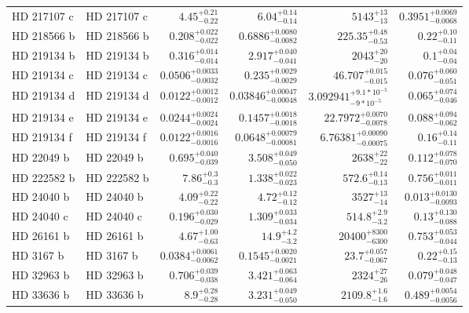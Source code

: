 \begin{longtable*}{llrrrr}
HD 217107 c & HD 217107 c & $4.45^{+0.21}_{-0.22}$ & $6.04^{+0.14}_{-0.14}$ & $5143^{+13}_{-13}$ & $0.3951^{+0.0069}_{-0.0068}$ \\ 
HD 218566 b & HD 218566 b & $0.208^{+0.022}_{-0.022}$ & $0.6886^{+0.0080}_{-0.0082}$ & $225.35^{+0.48}_{-0.53}$ & $0.22^{+0.10}_{-0.11}$ \\ 
HD 219134 b & HD 219134 b & $0.316^{+0.014}_{-0.014}$ & $2.917^{+0.040}_{-0.041}$ & $2043^{+20}_{-20}$ & $0.1^{+0.04}_{-0.04}$ \\ 
HD 219134 c & HD 219134 c & $0.0506^{+0.0033}_{-0.0032}$ & $0.235^{+0.0029}_{-0.0029}$ & $46.707^{+0.015}_{-0.015}$ & $0.076^{+0.060}_{-0.051}$ \\ 
HD 219134 d & HD 219134 d & $0.0122^{+0.0012}_{-0.0012}$ & $0.03846^{+0.00047}_{-0.00048}$ & $3.092941^{+9.1*10^{-5}}_{-9*10^{-5}}$ & $0.065^{+0.074}_{-0.046}$ \\ 
HD 219134 e & HD 219134 e & $0.0244^{+0.0024}_{-0.0024}$ & $0.1457^{+0.0018}_{-0.0018}$ & $22.7972^{+0.0070}_{-0.0078}$ & $0.088^{+0.094}_{-0.062}$ \\ 
HD 219134 f & HD 219134 f & $0.0122^{+0.0016}_{-0.0016}$ & $0.0648^{+0.00079}_{-0.00081}$ & $6.76381^{+0.00090}_{-0.00075}$ & $0.16^{+0.14}_{-0.11}$ \\ 
HD 22049 b & HD 22049 b & $0.695^{+0.040}_{-0.039}$ & $3.508^{+0.049}_{-0.050}$ & $2638^{+22}_{-22}$ & $0.112^{+0.078}_{-0.070}$ \\ 
HD 222582 b & HD 222582 b & $7.86^{+0.3}_{-0.3}$ & $1.338^{+0.022}_{-0.023}$ & $572.6^{+0.14}_{-0.13}$ & $0.756^{+0.011}_{-0.011}$ \\ 
HD 24040 b & HD 24040 b & $4.09^{+0.22}_{-0.22}$ & $4.72^{+0.12}_{-0.12}$ & $3527^{+13}_{-14}$ & $0.013^{+0.0130}_{-0.0093}$ \\ 
HD 24040 c & HD 24040 c & $0.196^{+0.030}_{-0.029}$ & $1.309^{+0.033}_{-0.034}$ & $514.8^{+2.9}_{-3.2}$ & $0.13^{+0.130}_{-0.088}$ \\ 
HD 26161 b & HD 26161 b & $4.67^{+1.00}_{-0.63}$ & $14.9^{+4.2}_{-3.2}$ & $20400^{+8300}_{-6300}$ & $0.753^{+0.053}_{-0.044}$ \\ 
HD 3167 b & HD 3167 b & $0.0384^{+0.0061}_{-0.0062}$ & $0.1545^{+0.0020}_{-0.0021}$ & $23.7^{+0.057}_{-0.067}$ & $0.22^{+0.15}_{-0.13}$ \\ 
HD 32963 b & HD 32963 b & $0.706^{+0.039}_{-0.038}$ & $3.421^{+0.063}_{-0.064}$ & $2324^{+27}_{-26}$ & $0.079^{+0.048}_{-0.047}$ \\ 
HD 33636 b & HD 33636 b & $8.9^{+0.28}_{-0.28}$ & $3.231^{+0.049}_{-0.050}$ & $2109.8^{+1.6}_{-1.6}$ & $0.489^{+0.0054}_{-0.0056}$ \\ 

\end{longtable*}
